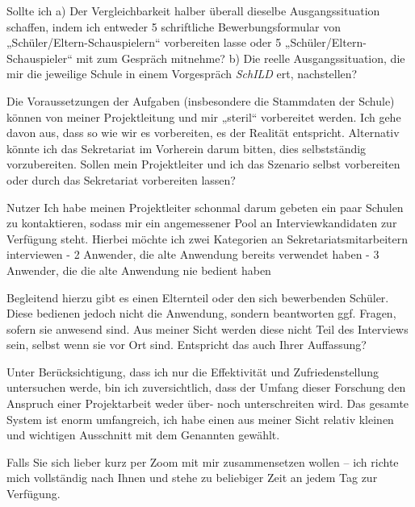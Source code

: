 Sollte ich 
a)	Der Vergleichbarkeit halber überall dieselbe Ausgangssituation schaffen, indem ich entweder 5 schriftliche Bewerbungsformular von „Schüler/Eltern-Schauspielern“ vorbereiten lasse oder 5 „Schüler/Eltern-Schauspieler“ mit zum Gespräch mitnehme?
b)	Die reelle Ausgangssituation, die mir die jeweilige Schule in einem Vorgespräch  \textit{SchILD} ert, nachstellen?

Die Voraussetzungen der Aufgaben (insbesondere die Stammdaten der Schule) können von meiner Projektleitung und mir „steril“ vorbereitet werden.
Ich gehe davon aus, dass so wie wir es vorbereiten, es der Realität entspricht. Alternativ könnte ich das Sekretariat im Vorherein darum bitten, dies selbstständig vorzubereiten.
Sollen mein Projektleiter und ich das Szenario selbst vorbereiten oder durch das Sekretariat vorbereiten lassen?

Nutzer
Ich habe meinen Projektleiter schonmal darum gebeten ein paar Schulen zu kontaktieren, sodass mir ein angemessener Pool an Interviewkandidaten zur Verfügung steht.
Hierbei möchte ich zwei Kategorien an Sekretariatsmitarbeitern interviewen
-	2 Anwender, die alte Anwendung bereits verwendet haben 
-	3 Anwender, die die alte Anwendung nie bedient haben 

Begleitend hierzu gibt es einen Elternteil oder den sich bewerbenden Schüler. Diese bedienen jedoch nicht die Anwendung, sondern beantworten ggf. Fragen, sofern sie anwesend sind.
Aus meiner Sicht werden diese nicht Teil des Interviews sein, selbst wenn sie vor Ort sind. Entspricht das auch Ihrer Auffassung?

Unter Berücksichtigung, dass ich nur die Effektivität und Zufriedenstellung untersuchen werde, bin ich zuversichtlich, dass der Umfang dieser Forschung den Anspruch einer Projektarbeit weder über- noch unterschreiten wird.
Das gesamte System ist enorm umfangreich, ich habe einen aus meiner Sicht relativ kleinen und wichtigen Ausschnitt mit dem Genannten gewählt.

Falls Sie sich lieber kurz per Zoom mit mir zusammensetzen wollen – ich richte mich vollständig nach Ihnen und stehe zu beliebiger Zeit an jedem Tag zur Verfügung.

